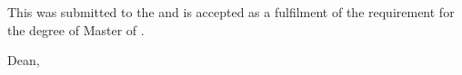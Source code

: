 \documentclass[12pt, a4paper, oneside]{memoir}
\begin{document}
\ifdefined\myCoSupervisor
  \ifdefined\myExaminer
    \newpage
  \fi
\fi

\noindent This \myDocument was submitted to the \myKulliyyah and 
is accepted as a fulfilment of the requirement for the degree of Master of 
\mySubject.\\[18pt]

\hfill \makebox[2in]{\dotfill}

\hfill \myKulliyahDean

\hfill Dean, \myKulliyyah\\
\end{document}
